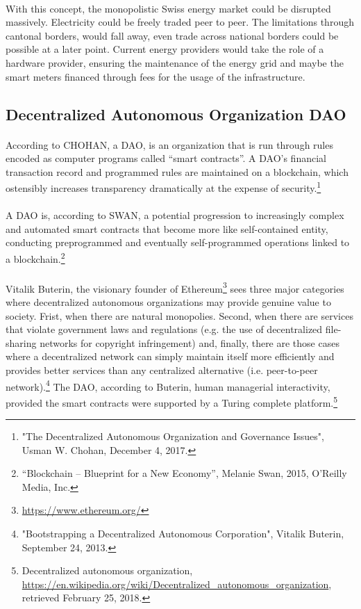 \documentclass{scrartcl}
\begin{document}
     \paragraph{}
     With this concept, the monopolistic Swiss energy market could be disrupted massively. Electricity could be freely traded peer to peer. The limitations through cantonal borders, would fall away, even trade across national borders could be possible at a later point. Current energy providers would take the role of a hardware provider, ensuring the maintenance of the energy grid and maybe the smart meters financed through fees for the usage of the infrastructure.
     
     \subsection{Decentralized Autonomous Organization DAO}
     
     \paragraph{}
     According to CHOHAN, a DAO, is an organization that is run through rules encoded as computer programs called “smart contracts”. A DAO's financial transaction record and programmed rules are maintained on a blockchain, which ostensibly increases transparency dramatically at the expense of security.\footnote{"The Decentralized Autonomous Organization and Governance Issues", Usman W. Chohan, December 4, 2017.}
     
     \paragraph{}
     A DAO is, according to SWAN, a potential progression to increasingly complex and automated smart contracts that become more like self-contained entity, conducting preprogrammed and eventually self-programmed operations linked to a blockchain.\footnote{“Blockchain – Blueprint for a New Economy”, Melanie Swan, 2015, O’Reilly Media, Inc.}
     
     \paragraph{}
     Vitalik Buterin, the visionary founder of Ethereum\footnote{\url{https://www.ethereum.org/}} sees three major categories where decentralized autonomous organizations may provide genuine value to society. Frist, when there are natural monopolies. Second, when there are services that violate government laws and regulations (e.g. the use of decentralized file-sharing networks for copyright infringement) and, finally, there are those cases where a decentralized network can simply maintain itself more efficiently and provides better services than any centralized alternative (i.e. peer-to-peer network).\footnote{"Bootstrapping a Decentralized Autonomous Corporation", Vitalik Buterin, September 24, 2013.} The DAO, according to Buterin, human managerial interactivity, provided the smart contracts were supported by a Turing complete platform.\footnote{Decentralized autonomous organization, \url{https://en.wikipedia.org/wiki/Decentralized_autonomous_organization}, retrieved February 25, 2018.} 
     
\end{document}
